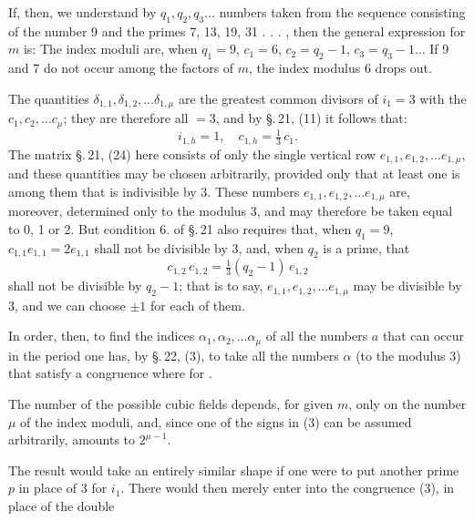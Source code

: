 If, then, we understand by $q_1, q_2, q_3 \ldots$ numbers taken from the sequence consisting of the number 9 and the primes 7, 13, 19, 31 . . . , then the general expression for $m$ is:
The index moduli are, when $q_1=9$, $c_1=6$, $c_2=q_2-1$, $c_3=q_3-1 \ldots$ If 9 and 7 do not occur among the factors of $m$, the index modulus 6 drops out.

The quantities $\delta_{1,1}, \delta_{1,2}, \ldots \delta_{1,\mu}$ are the greatest common divisors of $i_1=3$ with the $c_1, c_2, \ldots c_\mu$; they are therefore all $=3$, and by \S.\,21, (11) it follows that:
\[
i_{1,h}=1,\quad c_{1,h}=\tfrac{1}{3}\,c_1.
\]
The matrix \S.\,21, (24) here consists of only the single vertical row $e_{1,1}, e_{1,2}, \ldots e_{1,\mu}$, and these quantities may be chosen arbitrarily, provided only that at least one is among them that is indivisible by 3. These numbers $e_{1,1}, e_{1,2}, \ldots e_{1,\mu}$ are, moreover, determined only to the modulus 3, and may therefore be taken equal to 0, 1 or 2. But condition 6. of \S.\,21 also requires that, when $q_1=9$, $c_{1,1}e_{1,1}=2e_{1,1}$ shall not be divisible by 3, and, when $q_2$ is a prime, that
\[
c_{1,2}\,e_{1,2}=\tfrac{1}{3}(q_2-1)\,e_{1,2}
\]
shall not be divisible by $q_2-1$; that is to say,  $e_{1,1}, e_{1,2}, \ldots e_{1,\mu}$ may be divisible by 3, and we can choose $\pm 1$ for each of them.

In order, then, to find the indices $\alpha_1, \alpha_2, \ldots \alpha_\mu$ of all the numbers $a$ that can occur in the period
one has, by \S.\,22, (3), to take all the numbers $\alpha$ (to the modulus 3) that satisfy a congruence
where for .

The number of the possible cubic fields depends, for given $m$, only on the number $\mu$ of the index moduli, and, since one of the signs in (3) can be assumed arbitrarily, amounts to $2^{\mu-1}$.

The result would take an entirely similar shape if one were to put another prime $p$ in place of 3 for $i_1$. There would then merely enter into the congruence (3), in place of the double
